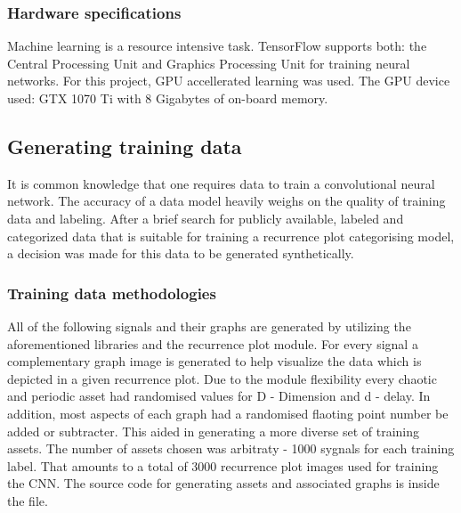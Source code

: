 \documentclass[a4paper,12pt,fleqn]{article}
\begin{document}
\subsubsection{Hardware specifications}
\label{sec:hardware}
Machine learning is a resource intensive task.
TensorFlow supports both: the Central Processing Unit and Graphics Processing Unit for training neural networks.
For this project, GPU accellerated learning was used. 
The GPU device used: GTX 1070 Ti with 8 Gigabytes of on-board memory. 


\subsection{Generating training data}
It is common knowledge that one requires data to train a convolutional neural network.
The accuracy of a data model heavily weighs on the quality of training data and labeling.
After a brief search for publicly available, labeled and categorized data that is suitable for training a recurrence plot categorising model, a decision was made for this data to be generated synthetically.


\subsubsection{Training data methodologies}
All of the following signals and their graphs are generated by utilizing
the aforementioned libraries and the recurrence plot module.
For every signal a complementary graph image is generated to help visualize the data which is depicted in a given recurrence plot.
Due to the module flexibility every chaotic and periodic asset had randomised values for D - Dimension and d - delay.
In addition, most aspects of each graph had a randomised flaoting point number be added or subtracter.
This aided in generating a more diverse set of training assets.
The number of assets chosen was arbitraty - 1000 sygnals for each training label.
That amounts to a total of 3000 recurrence plot images used for training the CNN.
The source code for generating assets and associated graphs is inside the  file.


\end{document}

